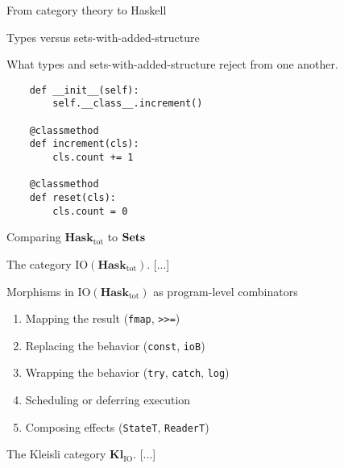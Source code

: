 \documentclass[11pt, a4paper]{article}
\begin{document}
\begin{section}{From category theory to Haskell}
\begin{subsection}{Types versus sets-with-added-structure}
\begin{subsubsection}{What types and sets-with-added-structure reject from one another.}
\begin{enumerate}
\begin{verbatim}
    def __init__(self):
        self.__class__.increment()

    @classmethod
    def increment(cls):
        cls.count += 1

    @classmethod
    def reset(cls):
        cls.count = 0
    \end{verbatim}
\end{enumerate}

\end{subsubsection}

\end{subsection}

\begin{subsection}{Comparing $\mathbf{Hask}_\text{tot}$ to $\bold{Sets}$}
\end{subsection}

\begin{subsection}{The category $\text{IO}(\mathbf{Hask}_\text{tot})$.}
[...]

\begin{subsubsection}{Morphisms in $\text{IO}(\mathbf{Hask}_{\text{tot}})$ as program-level combinators}
\begin{enumerate}
\item
Mapping the result (\texttt{fmap}, \texttt{>>=})
\item
Replacing the behavior (\texttt{const}, \texttt{ioB})
\item
Wrapping the behavior (\texttt{try}, \texttt{catch}, \texttt{log})
\item
Scheduling or deferring execution
\item
Composing effects (\texttt{StateT}, \texttt{ReaderT})
\end{enumerate}
\end{subsubsection}

\end{subsection}

\begin{subsection}{The Kleisli category $\mathbf{Kl}_\text{IO}$.}
[...]
\end{subsection}

\end{section}




\end{document}
